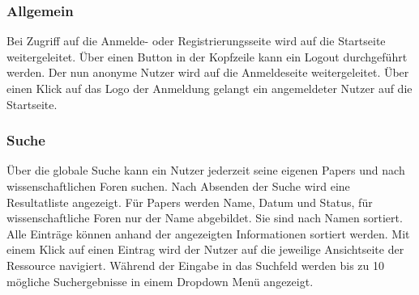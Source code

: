 \subsubsection{Allgemein}
\begin{description}
     Bei Zugriff auf die Anmelde- oder Registrierungsseite
    wird auf die Startseite weitergeleitet.
     Über einen Button in der Kopfzeile kann ein Logout durchgeführt werden.
    Der nun anonyme Nutzer wird auf die Anmeldeseite weitergeleitet.
     Über einen Klick auf das Logo der Anmeldung gelangt ein angemeldeter Nutzer auf die
    Startseite.
\end{description}

\subsubsection{Suche}
\begin{description}
     Über die globale Suche kann ein Nutzer jederzeit seine eigenen Papers und nach wissenschaftlichen Foren
    suchen. Nach Absenden der Suche wird eine Resultatliste angezeigt. Für Papers werden Name, Datum und Status, für
    wissenschaftliche Foren nur der Name abgebildet.
    Sie sind nach Namen sortiert.
     Alle Einträge können anhand der angezeigten Informationen sortiert werden.
    Mit einem Klick auf einen Eintrag wird der Nutzer auf die jeweilige Ansichtseite
    der Ressource navigiert.
     Während der Eingabe in das Suchfeld werden bis zu 10 mögliche Suchergebnisse in
    einem Dropdown Menü angezeigt.
\end{description}

